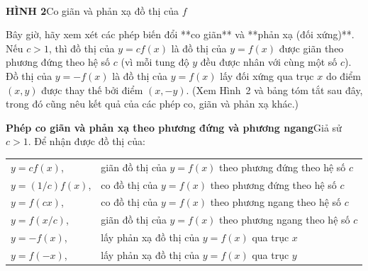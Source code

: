 \begin{minipage}[t]{0.708\textwidth}
\begin{center}
\\[4pt]
    {\fontsize{8.5pt}{10.5pt}\selectfont\textbf{\textsf{HÌNH 2}}\quad \textsf{Co giãn và phản xạ đồ thị của $f$}}
    \end{center}

    Bây giờ, hãy xem xét các phép biến đổi **co giãn** và **phản xạ (đối xứng)**. Nếu $c > 1$, thì đồ thị của $y = cf(x)$ là đồ thị của $y = f(x)$ được giãn theo phương đứng theo hệ số $c$ (vì mỗi tung độ $y$ đều được nhân với cùng một số $c$). Đồ thị của $y = -f(x)$ là đồ thị của $y = f(x)$ lấy đối xứng qua trục $x$ do điểm $(x, y)$ được thay thế bởi điểm $(x, -y)$. (Xem Hình~2 và bảng tóm tắt sau đây, trong đó cũng nêu kết quả của các phép co, giãn và phản xạ khác.)

    \begin{definitionbox}
        \textbf{\textsf{\color{stewartred}Phép co giãn và phản xạ theo phương đứng và phương ngang}}\quad Giả sử $c > 1$. Để nhận được đồ thị của:
        \vspace{4pt}

        \noindent
        \begin{tabular}{@{}ll@{}}
        $y = cf(x)$, & giãn đồ thị của $y = f(x)$ theo phương đứng theo hệ số $c$ \\
        $y = (1/c)f(x)$, & co đồ thị của $y = f(x)$ theo phương đứng theo hệ số $c$ \\
        $y = f(cx)$, & co đồ thị của $y = f(x)$ theo phương ngang theo hệ số $c$ \\
        $y = f(x/c)$, & giãn đồ thị của $y = f(x)$ theo phương ngang theo hệ số $c$ \\
        $y = -f(x)$, & lấy phản xạ đồ thị của $y = f(x)$ qua trục $x$ \\
        $y = f(-x)$, & lấy phản xạ đồ thị của $y = f(x)$ qua trục $y$
        \end{tabular}
    \end{definitionbox}
\end{minipage}